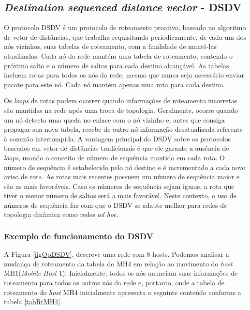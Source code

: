 \subsection{\textit{Destination sequenced distance vector} - DSDV} 
O protocolo DSDV \'e um protocolo de roteamento proativo\cite{gorantala}, baseado no algoritmo de vetor de dist\^ancias, que trabalha requisitando periodicamente, de cada um dos n\'os vizinhos, suas tabelas de roteamento, com a finalidade de mant\^e-las atualizadas. 
Cada n\'o da rede mant\'em uma tabela de roteamento, contendo o pr\'oximo salto e o n\'umero de saltos para cada destino alcan\c{c}\'avel. 
As tabelas incluem rotas para todos os n\'os da rede, mesmo que nunca seja necess\'ario enviar pacote para este n\'o. 
Cada n\'o mant\'em apenas uma rota para cada destino.

Os \textit{loops} de rotas podem ocorrer quando informa\c{c}\~oes de roteamento incorretas s\~ao mantidas na rede ap\'os uma troca de topologia. 
Geralmente, ocorre quando um n\'o detecta uma queda no enlace com o n\'o vizinho e, antes que consiga propagar sua nova tabela, recebe de outro n\'o informa\c{c}\~ao desatualizada referente \`a conex\~ao interrompida. 
A vantagem principal do DSDV sobre os protocolos baseados em vetor de dist\^ancias tradicionais \'e que ele garante a aus\^encia de \textit{loops}, usando o conceito de n\'umero de sequ\^encia mantido em cada rota. 
O n\'umero de sequ\^encia \'e estabelecido pelo n\'o destino e \'e incrementado a cada novo aviso de rota.
As rotas mais recentes possuem um n\'umero de sequ\^encia maior e s\~ao as mais favor\'aveis. 
Caso os n\'umeros de sequ\^encia sejam iguais, a rota que tiver o menor n\'umero de saltos ser\'a a mais favor\'avel. 
Neste contexto, o uso de n\'umeros de sequ\^encia faz com que o DSDV se adapte melhor para redes de topologia din\^amica como redes \textit{ad hoc}.

\subsubsection{Exemplo de funcionamento do DSDV}

A Figura \ref{figOpDSDV}, descreve uma rede com 8 hosts. 
Podemos analisar a mudan\c{c}a de roteamento da tabela do MH4 em rela\c{c}\~ao ao movimento do \textit{host} MH1(\textit{Mobile Host} 1). 
Inicialmente, todos os n\'os anunciam suas informa\c{c}\~oes de roteamento para todos os outros n\'os da rede e, portanto, onde a tabela de roteamento do \textit{host} MH4 inicialmente apresenta o seguinte conte\'udo conforme a tabela \ref{tabRtMH4}.

